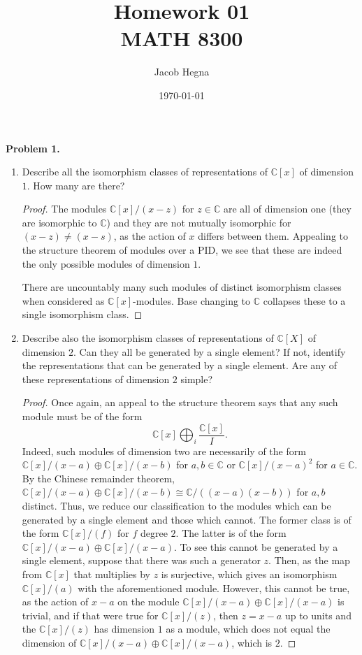 \documentclass[reqno]{amsart}
\title{Homework 01\\MATH 8300}
\author{Jacob Hegna}
\date{\today}
\theoremstyle{definition}
\theoremstyle{remark}
\newcommand{\prob}[1] {
  \textbf{Problem #1.}
}
\begin{document}
\maketitle

\prob{1}
\begin{enumerate}
  \item Describe all the isomorphism classes of representations of
    $\mathbb{C}[x]$ of dimension $1$. How many are there?
    \begin{proof}
      The modules $\mathbb{C}[x]/(x-z)$ for $z \in \mathbb{C}$ are all of
      dimension one (they are isomorphic to $\mathbb{C}$) and they are not
      mutually isomorphic for $(x-z) \neq (x-s)$, as the action of $x$ differs
      between them. Appealing to the structure theorem of modules over a PID, we
      see that these are indeed the only possible modules of dimension $1$.

      There are uncountably many such modules of distinct isomorphism classes
      when considered as $\mathbb{C}[x]$-modules. Base changing to $\mathbb{C}$
      collapses these to a single isomorphism class.
    \end{proof}

  \item Describe also the isomorphism classes of representations of
    $\mathbb{C}[X]$ of dimension $2$. Can they all be generated by a single
    element? If not, identify the representations that can be generated by a
    single element. Are any of these representations of dimension $2$ simple?

    \begin{proof}
      Once again, an appeal to the structure theorem says that any such module
      must be of the form
      \[
        \mathbb{C}[x] \bigoplus_i \frac{\mathbb{C}[x]}{I}.
      \]
      Indeed, such modules of dimension two are necessarily of the form
      $\mathbb{C}[x]/(x-a) \oplus \mathbb{C}[x]/(x-b)$ for $a, b \in \mathbb{C}$
      or $\mathbb{C}[x]/(x-a)^2$ for $a \in \mathbb{C}$. By the Chinese
      remainder theorem, $\mathbb{C}[x]/(x-a) \oplus \mathbb{C}[x]/(x-b) \cong
      \mathbb{C}/\left((x-a)(x-b)\right)$ for $a, b$ distinct. Thus, we reduce
      our classification to the modules which can be generated by a single
      element and those which cannot. The former class is of the form
      $\mathbb{C}[x]/(f)$ for $f$ degree $2$. The latter is of the form
      $\mathbb{C}[x]/(x-a) \oplus \mathbb{C}[x]/(x-a)$. To see this cannot be
      generated by a single element, suppose that there was such a generator
      $z$. Then, as the map from $\mathbb{C}[x]$ that multiplies by $z$ is
      surjective, which gives an isomorphism $\mathbb{C}[x]/(a)$ with the
      aforementioned module. However, this cannot be true, as the action of
      $x-a$ on the module $\mathbb{C}[x]/(x-a) \oplus \mathbb{C}[x]/(x-a)$ is
      trivial, and if that were true for $\mathbb{C}[x]/(z)$, then $z = x-a$
      up to units and the $\mathbb{C}[x]/(z)$ has dimension $1$ as a module,
      which does not equal the dimension of $\mathbb{C}[x]/(x-a) \oplus
      \mathbb{C}[x]/(x-a)$, which is $2$.
    \end{proof}
\end{enumerate}
\end{document}
